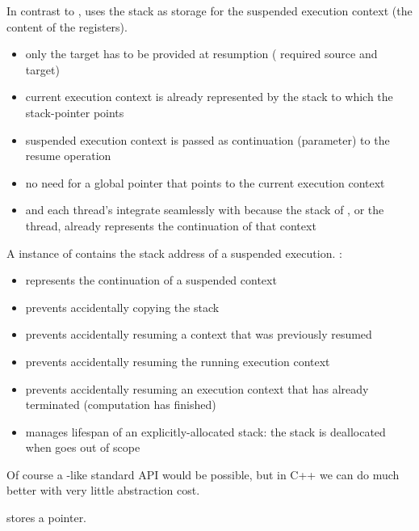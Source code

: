 \newpage
{}


In contrast to \uc, \cc uses the stack as storage for the suspended
execution context (the content of the registers).

\begin{itemize}
    \item only the target has to be provided at resumption
        ( required source and target)
    \item current execution context is already represented by the
        stack to which the stack-pointer points
    \item suspended execution context is passed as continuation (parameter) 
        to the resume operation
    \item no need for a global pointer that points to the current execution context
    \item \main and each thread's \entryfn integrate seamlessly with \cc
        because the stack of \main, or the thread, already represents the continuation of
        that context
\end{itemize}


A instance of \cont contains the stack address of a suspended execution.
\cont:

\begin{itemize}
    \item represents the continuation of a suspended context
    \item prevents accidentally copying the stack
    \item prevents accidentally resuming a context that was previously resumed
    \item prevents accidentally resuming the running execution
        context
    \item prevents accidentally resuming an execution context that has already
        terminated (computation has finished)
    \item manages lifespan of an explicitly-allocated stack: the stack is
        deallocated when \cont goes out of scope
\end{itemize}

Of course a \uc-like standard API would be possible, but in C++ we can do much
better with very little abstraction cost.

\cont stores a pointer.

